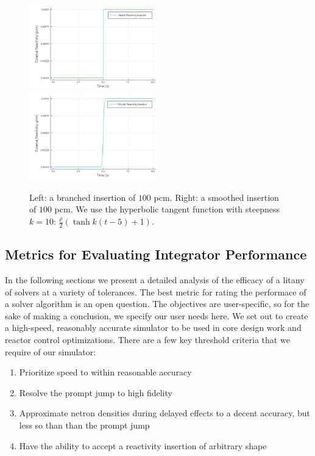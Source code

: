 \documentclass[review,onefignum,onetabnum]{siamart171218}
\begin{document}
\begin{figure}[htb]
  \includegraphics[width=0.5\textwidth]{../plots/insertion-plots/branch.png}
  \includegraphics[width=0.5\textwidth]{../plots/insertion-plots/smooth.png}
  \caption{Left: a branched insertion of $100$ pcm. Right: a smoothed insertion of $100$ pcm. We
  use the hyperbolic tangent function with steepness $k=10$: $\frac{\rho}{2}(\tanh{k(t - 5)} + 1)$.}
  \label{fig:branch-smooth}
\end{figure}

\subsection{Metrics for Evaluating Integrator Performance}
In the following sections we present a detailed analysis of the efficacy of a litany of solvers
at a variety of tolerances. The best metric for rating the performace of a solver algorithm
is an open question. The objectives are user-specific, so for the sake of making a
conclusion, we specify our user needs here. We set out to create a high-speed,
reasonably accurate simulator to be used in core design work and reactor control
optimizations. There are a few key threshold criteria that we require of our simulator:\\

\begin{enumerate}
  \item Prioritize speed to within reasonable accuracy
  \item Resolve the prompt jump to high fidelity %
  \item Approximate netron densities during delayed effects to a decent accuracy, but less
  so than than the prompt jump %
  \item Have the ability to accept a reactivity insertion of arbitrary shape
\end{enumerate}
\end{document}
